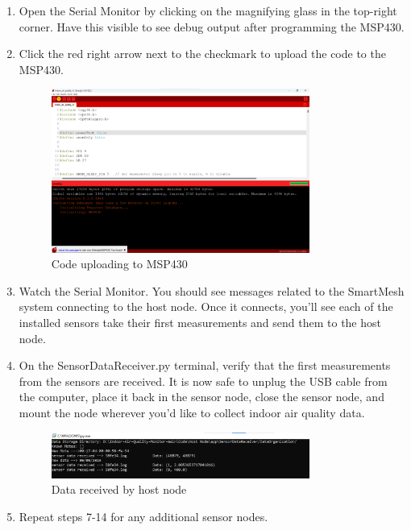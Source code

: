 \begin{enumerate}
\item Open the Serial Monitor by clicking on the magnifying glass in the top-right corner. Have this visible to see debug output after programming the MSP430.
\item Click the red right arrow next to the checkmark to upload the code to the MSP430.

\begin{figure}[H]
    \centering
    \includegraphics[width=0.8\textwidth]{Pictures/code uploading.png}
    \caption[Code uploading to MSP430]{Code uploading to MSP430} 
    \label{fig:part1commrin}
\end{figure}

\item Watch the Serial Monitor. You should see messages related to the SmartMesh system connecting to the host node. Once it connects, you'll see each of the installed sensors take their first measurements and send them to the host node.
\item On the SensorDataReceiver.py terminal, verify that the first measurements from the sensors are received. It is now safe to unplug the USB cable from the computer, place it back in the sensor node, close the sensor node, and mount the node wherever you'd like to collect indoor air quality data.

\begin{figure}[H]
    \centering
    \includegraphics[width=0.8\textwidth]{Pictures/data received.png}
    \caption[Data received by host node]{Data received by host node} 
    \label{fig:part1commrin}
\end{figure}

\item Repeat steps 7-14 for any additional sensor nodes.
\end{enumerate}
